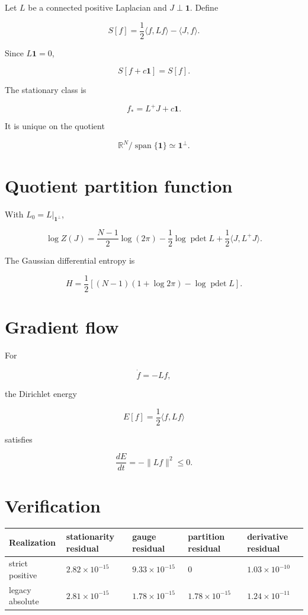 \documentclass[11pt,a4paper,openany]{report}
\begin{document}
Let \(L\) be a connected positive Laplacian and \(J\perp\mathbf1\). Define

\[
S[f]
=
\frac12\langle f,Lf\rangle-\langle J,f\rangle.
\]

Since \(L\mathbf1=0\),

\[
S[f+c\mathbf1]=S[f].
\]

The stationary class is

\[
f_*
=
L^+J+c\mathbf1.
\]

It is unique on the quotient

\[
\mathbb R^N/\operatorname{span}\{\mathbf1\}
\simeq
\mathbf1^\perp.
\]

\section{Quotient partition function}

With \(L_0=L|_{\mathbf1^\perp}\),

\[
\log Z(J)
=
\frac{N-1}{2}\log(2\pi)
-
\frac12\log\operatorname{pdet}L
+
\frac12\langle J,L^+J\rangle.
\]

The Gaussian differential entropy is

\[
H
=
\frac12
\left[
(N-1)(1+\log2\pi)
-
\log\operatorname{pdet}L
\right].
\]

\section{Gradient flow}

For

\[
\dot f=-Lf,
\]

the Dirichlet energy

\[
E[f]=\frac12\langle f,Lf\rangle
\]

satisfies

\[
\frac{dE}{dt}
=
-\|Lf\|^2
\le0.
\]

\section{Verification}

\begin{center}
\begingroup\footnotesize
\setlength{\tabcolsep}{3.5pt}
\renewcommand{\arraystretch}{1.16}
\begin{longtable}{@{}p{}p{}p{}p{}p{}@{}}
\toprule
\textbf{Realization} & \textbf{stationarity residual} & \textbf{gauge residual} & \textbf{partition residual} & \textbf{derivative residual} \\
\midrule
\endhead
strict positive & \(2.82\times10^{-15}\) & \(9.33\times10^{-15}\) & \(0\) & \(1.03\times10^{-10}\) \\
legacy absolute & \(2.81\times10^{-15}\) & \(1.78\times10^{-15}\) & \(1.78\times10^{-15}\) & \(1.24\times10^{-11}\) \\
\bottomrule
\end{longtable}
\endgroup
\end{center}
\end{document}
